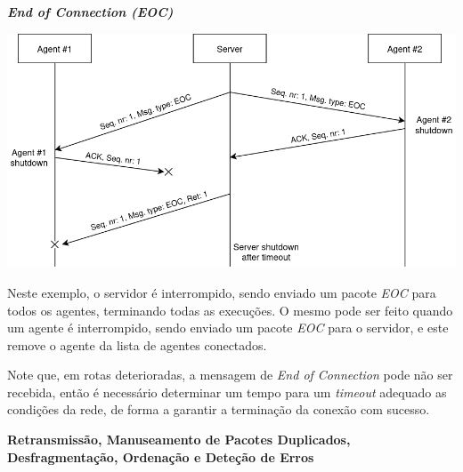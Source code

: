 \documentclass[a4paper,12pt]{scrreprt}
\begin{document}
\vspace{1cm}

\textbf{\textit{End of Connection (EOC)}}

\begin{minipage}{\textwidth}
    \centering
    \includegraphics[width=\textwidth]{img/sequence_diagrams/end_of_connection.png}
    \label{fig:nt_end_of_connection}
\end{minipage}

Neste exemplo, o servidor é interrompido, sendo enviado um pacote \textit{EOC} para
todos os agentes, terminando todas as execuções. O mesmo pode ser feito quando um agente
é interrompido, sendo enviado um pacote \textit{EOC} para o servidor, e este remove
o agente da lista de agentes conectados.

Note que, em rotas deterioradas, a mensagem de \textit{End of Connection} pode não ser recebida,
então é necessário determinar um tempo para um \textit{timeout} adequado as condições da rede,
de forma a garantir a terminação da conexão com sucesso.

\clearpage
\textbf{Retransmissão, Manuseamento de Pacotes Duplicados, Desfragmentação, Ordenação e Deteção de Erros}
\end{document}
